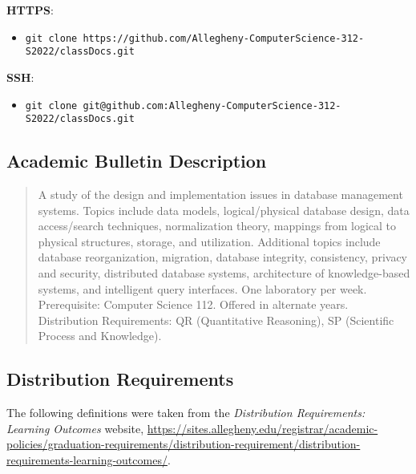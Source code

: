 \documentclass[11pt]{article} %
\begin{document}
\textbf{HTTPS}: 
	\begin{itemize}
		\item {\tt \footnotesize git clone https://github.com/Allegheny-ComputerScience-312-S2022/classDocs.git}
	\end{itemize}

\textbf{SSH}: 
	\begin{itemize}
		\item {\tt \footnotesize git clone git@github.com:Allegheny-ComputerScience-312-S2022/classDocs.git}
	\end{itemize}







\subsection*{\textbf{Academic Bulletin Description}}

\begin{quote}

  A study of the design and implementation issues in database management systems. Topics include data models, logical/physical database design, data access/search techniques, normalization theory, mappings from logical to physical structures, storage, and utilization. Additional topics include database reorganization, migration, database integrity, consistency, privacy and security, distributed database systems, architecture of knowledge-based systems, and intelligent query interfaces. One laboratory per week. Prerequisite: Computer Science 112.  Offered in alternate years. Distribution Requirements: QR (Quantitative Reasoning), SP (Scientific Process and Knowledge).

\end{quote}


\subsection*{Distribution Requirements}
The following definitions were taken from the \emph{Distribution Requirements: Learning Outcomes} website, \url{https://sites.allegheny.edu/registrar/academic-policies/graduation-requirements/distribution-requirement/distribution-requirements-learning-outcomes/}.
\end{document}

